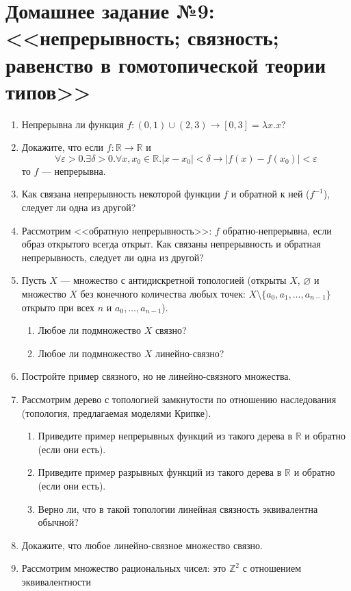 \documentclass[10pt,a4paper,oneside]{article}
\begin{document}
\section*{Домашнее задание №9: <<непрерывность; связность; равенство в гомотопической теории типов>>}
\begin{enumerate}
\item Непрерывна ли функция $f: (0,1) \cup (2,3) \rightarrow [0,3] = \lambda x.x$?
\item Докажите, что если $f: \mathbb{R}\rightarrow\mathbb{R}$ и 
$$\forall \varepsilon > 0 . \exists \delta > 0. \forall x,x_0 \in \mathbb{R} . |x-x_0| < \delta \rightarrow |f(x)-f(x_0)| < \varepsilon$$
то $f$ --- непрерывна.
\item Как связана непрерывность некоторой функции $f$ и обратной к ней ($f^{-1}$), следует ли одна из другой?
\item Рассмотрим <<обратную непрерывность>>: $f$ обратно-непрерывна, если образ открытого всегда открыт.
Как связаны непрерывность и обратная непрерывность, следует ли одна из другой?
\item Пусть $X$ --- множество с антидискретной топологией (открыты $X$, $\varnothing$ и множество $X$
без конечного количества любых точек: $X \setminus \{a_0, a_1, \dots, a_{n-1}\}$ открыто при всех $n$ и $a_0, \dots, a_{n-1}$). 
\begin{enumerate}
\item Любое ли подмножество $X$ связно?
\item Любое ли подмножество $X$ линейно-связно?
\end{enumerate}
\item Постройте пример связного, но не линейно-связного множества.
\item Рассмотрим дерево с топологией замкнутости по отношению наследования (топология, предлагаемая
моделями Крипке). \begin{enumerate}
\item Приведите пример непрерывных функций из такого дерева в $\mathbb{R}$ и обратно (если они есть).
\item Приведите пример разрывных функций из такого дерева в $\mathbb{R}$ и обратно (если они есть).
\item Верно ли, что в такой топологии линейная связность эквивалентна обычной?
\end{enumerate}
\item Докажите, что любое линейно-связное множество связно.
\item Рассмотрим множество рациональных чисел: это $\mathbb{Z}^2$ с отношением эквивалентности

\end{enumerate}
\end{document}
